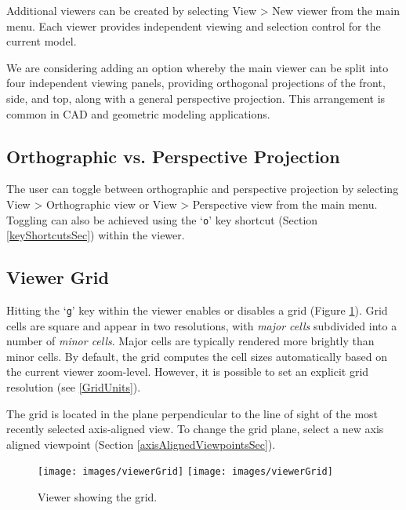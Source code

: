 \documentclass{article}
\begin{document}
Additional viewers can be created by selecting {\sf View > New viewer}
from the main menu. Each viewer provides independent viewing and
selection control for the current model.

\begin{sideblock}
We are considering adding an option whereby the main viewer can
be split into four independent viewing panels, providing
orthogonal projections of the front, side, and top, along
with a general perspective projection. This arrangement is common
in CAD and geometric modeling applications.
\end{sideblock}

\subsection{Orthographic vs. Perspective Projection}
\label{ProjectionSec}

The user can toggle between orthographic and perspective projection by
selecting {\sf View > Orthographic view} or {\sf View > Perspective
view} from the main menu. Toggling can also be achieved using the
`{\tt o}' key shortcut (Section \ref{keyShortcutsSec}) within the
viewer.

\subsection{Viewer Grid}
\label{ViewerGrid}

Hitting the `{\tt g}' key within the viewer enables or disables a grid
(Figure \ref{viewerGridFig}). Grid cells are square and appear in two
resolutions, with {\it major cells} subdivided into a number of {\it
minor cells}. Major cells are typically rendered more brightly than
minor cells. By default, the grid computes the cell sizes
automatically based on the current viewer zoom-level. However, it is
possible to set an explicit grid resolution (see
\ref{GridUnits}).

The grid is located in the plane perpendicular to the line of sight of
the most recently selected axis-aligned view. To change the grid
plane, select a new axis aligned viewpoint (Section
\ref{axisAlignedViewpointsSec}).

\begin{figure}
\begin{center}
\iflatexml
\texttt{[image: images/viewerGrid]}
\else
\texttt{[image: images/viewerGrid]}
\fi
\end{center}
\caption{Viewer showing the grid.}%
\label{viewerGridFig}
\end{figure}
\end{document}
